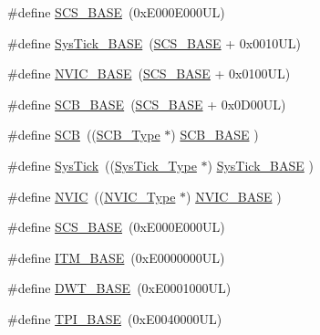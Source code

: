\begin{DoxyCompactItemize}
\item 
\#define \hyperlink{group___c_m_s_i_s__core__base_ga3c14ed93192c8d9143322bbf77ebf770}{S\+C\+S\+\_\+\+B\+A\+SE}~(0x\+E000\+E000\+U\+L)
\item 
\#define \hyperlink{group___c_m_s_i_s__core__base_ga58effaac0b93006b756d33209e814646}{Sys\+Tick\+\_\+\+B\+A\+SE}~(\hyperlink{group___c_m_s_i_s__core__base_ga3c14ed93192c8d9143322bbf77ebf770}{S\+C\+S\+\_\+\+B\+A\+SE} +  0x0010\+U\+L)
\item 
\#define \hyperlink{group___c_m_s_i_s__core__base_gaa0288691785a5f868238e0468b39523d}{N\+V\+I\+C\+\_\+\+B\+A\+SE}~(\hyperlink{group___c_m_s_i_s__core__base_ga3c14ed93192c8d9143322bbf77ebf770}{S\+C\+S\+\_\+\+B\+A\+SE} +  0x0100\+U\+L)
\item 
\#define \hyperlink{group___c_m_s_i_s__core__base_gad55a7ddb8d4b2398b0c1cfec76c0d9fd}{S\+C\+B\+\_\+\+B\+A\+SE}~(\hyperlink{group___c_m_s_i_s__core__base_ga3c14ed93192c8d9143322bbf77ebf770}{S\+C\+S\+\_\+\+B\+A\+SE} +  0x0\+D00\+U\+L)
\item 
\#define \hyperlink{group___c_m_s_i_s__core__base_gaaaf6477c2bde2f00f99e3c2fd1060b01}{S\+CB}~((\hyperlink{struct_s_c_b___type}{S\+C\+B\+\_\+\+Type}       $\ast$)     \hyperlink{group___c_m_s_i_s__core__base_gad55a7ddb8d4b2398b0c1cfec76c0d9fd}{S\+C\+B\+\_\+\+B\+A\+SE}      )
\item 
\#define \hyperlink{group___c_m_s_i_s__core__base_gacd96c53beeaff8f603fcda425eb295de}{Sys\+Tick}~((\hyperlink{struct_sys_tick___type}{Sys\+Tick\+\_\+\+Type}   $\ast$)     \hyperlink{group___c_m_s_i_s__core__base_ga58effaac0b93006b756d33209e814646}{Sys\+Tick\+\_\+\+B\+A\+SE}  )
\item 
\#define \hyperlink{group___c_m_s_i_s__core__base_gac8e97e8ce56ae9f57da1363a937f8a17}{N\+V\+IC}~((\hyperlink{struct_n_v_i_c___type}{N\+V\+I\+C\+\_\+\+Type}      $\ast$)     \hyperlink{group___c_m_s_i_s__core__base_gaa0288691785a5f868238e0468b39523d}{N\+V\+I\+C\+\_\+\+B\+A\+SE}     )
\item 
\#define \hyperlink{group___c_m_s_i_s__core__base_ga3c14ed93192c8d9143322bbf77ebf770}{S\+C\+S\+\_\+\+B\+A\+SE}~(0x\+E000\+E000\+U\+L)
\item 
\#define \hyperlink{group___c_m_s_i_s__core__base_gadd76251e412a195ec0a8f47227a8359e}{I\+T\+M\+\_\+\+B\+A\+SE}~(0x\+E0000000\+U\+L)
\item 
\#define \hyperlink{group___c_m_s_i_s__core__base_gafdab534f961bf8935eb456cb7700dcd2}{D\+W\+T\+\_\+\+B\+A\+SE}~(0x\+E0001000\+U\+L)
\item 
\#define \hyperlink{group___c_m_s_i_s__core__base_ga2b1eeff850a7e418844ca847145a1a68}{T\+P\+I\+\_\+\+B\+A\+SE}~(0x\+E0040000\+U\+L)

\end{DoxyCompactItemize}
